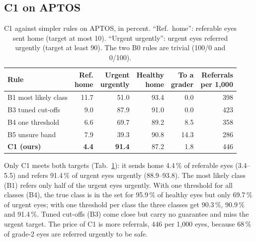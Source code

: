 \documentclass[10pt,twocolumn,letterpaper]{article}
\newcommand{\pct}{\,\%}
\begin{document}
\subsection{C1 on APTOS}
\begin{table}[t]\centering\small
\begin{adjustbox}{max width=\linewidth}\begin{tabular}{@{}lrrrrr@{}}\toprule
Rule & \shortstack{Ref.\\home} & \shortstack{Urgent\\urgently} & \shortstack{Healthy\\home} & \shortstack{To a\\grader} & \shortstack{Referrals\\per 1,000}\\\midrule
B1 most likely class & 11.7 & 51.0 & 93.4 & 0.0 & 398\\
B3 tuned cut-offs & 9.0 & 87.9 & 91.0 & 0.0 & 423\\
B4 one threshold & 6.6 & 69.7 & 89.2 & 8.5 & 358\\
B5 unsure band & 7.9 & 39.3 & 90.8 & 14.3 & 286\\
\textbf{C1 (ours)} & \textbf{4.4} & \textbf{91.4} & 87.2 & 1.8 & 446\\\bottomrule
\end{tabular}\end{adjustbox}
\caption{C1 against simpler rules on APTOS, in percent. ``Ref.\ home'': referable eyes sent home (target at most 10). ``Urgent urgently'': urgent eyes referred urgently (target at least 90). The two B0 rules are trivial (100/0 and 0/100).}\label{tab:c1}
\end{table}
Only C1 meets both targets (Tab.~\ref{tab:c1}): it sends home 4.4\pct{} of referable eyes (3.4--5.5) and refers 91.4\pct{} of urgent eyes urgently (88.9--93.8). The most likely class (B1) refers only half of the urgent eyes urgently. With one threshold for all classes (B4), the true class is in the set for 95.9\pct{} of healthy eyes but only 69.7\pct{} of urgent eyes; with one threshold per class the three classes get 90.3\pct, 90.9\pct{} and 91.4\pct. Tuned cut-offs (B3) come close but carry no guarantee and miss the urgent target. The price of C1 is more referrals, 446 per 1,000 eyes, because 68\pct{} of grade-2 eyes are referred urgently to be safe.
\end{document}

